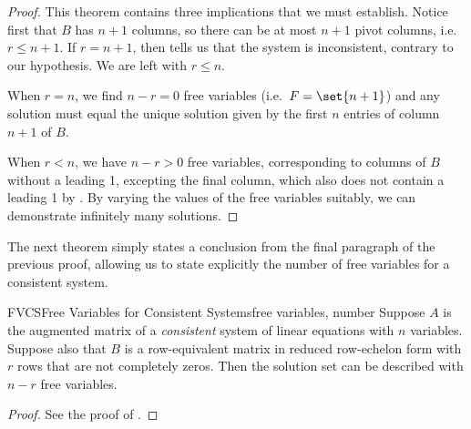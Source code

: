 %
\begin{proof}
This theorem contains three implications that we must establish.  Notice first that $B$ has $n+1$ columns, so there can be at most $n+1$ pivot columns, i.e.\ $r\leq n+1$.  If $r=n+1$, then  tells us that the system is inconsistent, contrary to our hypothesis. We are left with $r\leq n$.\par
%
When $r=n$, we find $n-r=0$ free variables (i.e.\ $F=\set{n+1}$) and any solution must equal the unique solution given by the first $n$ entries of column $n+1$ of $B$.\par
%
When $r<n$, we have $n-r>0$ free variables, corresponding to columns of $B$ without a leading 1, excepting the final column, which also does not contain a leading 1 by .  By varying the values of the free variables suitably, we can demonstrate infinitely many solutions.
\end{proof}
%
%
The next theorem simply states a conclusion from the final paragraph of the previous proof, allowing us to state explicitly the number of free variables for a consistent system.
%
\begin{theorem}{FVCS}{Free Variables for Consistent Systems}{free variables, number}
Suppose $A$ is the augmented matrix of a {\em consistent} system of linear equations with $n$ variables.  Suppose also that $B$ is a row-equivalent matrix in reduced row-echelon form with $r$ rows that are not completely zeros.  Then the solution set can be described with $n-r$ free variables.
\end{theorem}
%
\begin{proof}
See the proof of .
\end{proof}
%
